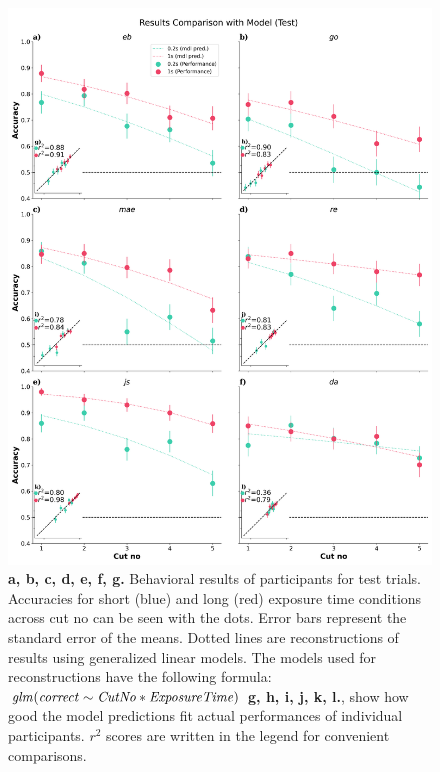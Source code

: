 \documentclass{article}
\begin{document}
\begin{figure}    
    \vspace{-1.3cm}
    \includegraphics[width=\textwidth]{plots/test_all.png}    
    \caption{\textbf{a, b, c, d, e, f, g.} Behavioral results of participants for test trials. Accuracies for short (blue) and long (red) exposure time conditions across cut no can be seen with the dots. Error bars represent the standard error of the means. Dotted lines are reconstructions of results using generalized linear models. The models used for reconstructions have the following formula: $\it{glm(correct \sim Cut No * Exposure Time)}$ \textbf{g, h, i, j, k, l.}, show how good the model predictions fit actual performances of individual participants. $r^2$ scores are written in the legend for convenient comparisons. }
    \label{fig:behav_test}
\end{figure}
\end{document}
